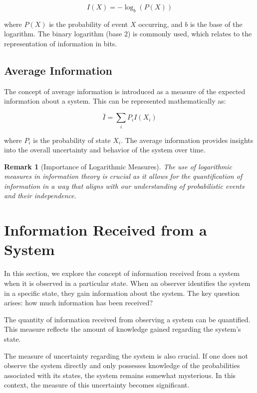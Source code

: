 \documentclass[12pt,a4paper]{article}
\newenvironment{defbox}[1][]{%
  \begin{tcolorbox}[enhanced, breakable, colback=defcolor, colframe=green!50!black, title=#1, fonttitle=\bfseries, arc=3pt, boxrule=0.5pt]
}{\end{tcolorbox}}
\newtheorem{remark}{Remark}[section]
\begin{document}
\begin{equation}
I(X) = -\log_b(P(X))
\end{equation}

where \( P(X) \) is the probability of event \( X \) occurring, and \( b \) is the base of the logarithm. The binary logarithm (base 2) is commonly used, which relates to the representation of information in bits.

\subsection{Average Information}
The concept of average information is introduced as a measure of the expected information about a system. This can be represented mathematically as:

\begin{equation}
\bar{I} = \sum_{i} P_i I(X_i)
\end{equation}

where \( P_i \) is the probability of state \( X_i \). The average information provides insights into the overall uncertainty and behavior of the system over time.

\begin{remark}[Importance of Logarithmic Measures]
The use of logarithmic measures in information theory is crucial as it allows for the quantification of information in a way that aligns with our understanding of probabilistic events and their independence.
\end{remark}

\section{Information Received from a System}
In this section, we explore the concept of information received from a system when it is observed in a particular state. When an observer identifies the system in a specific state, they gain information about the system. The key question arises: how much information has been received?

\begin{defbox}[Quantity of Information]
The quantity of information received from observing a system can be quantified. This measure reflects the amount of knowledge gained regarding the system's state.
\end{defbox}

The measure of uncertainty regarding the system is also crucial. If one does not observe the system directly and only possesses knowledge of the probabilities associated with its states, the system remains somewhat mysterious. In this context, the measure of this uncertainty becomes significant.
\end{document}
